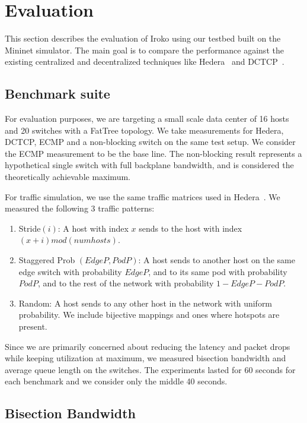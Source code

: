 
\section{Evaluation} \label{sec:evaluation}

This section describes the evaluation of Iroko using our testbed built on the
Mininet simulator. The main goal is to compare the performance against the
existing centralized and decentralized techniques like Hedera~\cite{hedera} and
DCTCP~\cite{dctcp}.

\subsection{Benchmark suite}

For evaluation purposes, we are targeting a small scale data center of 16 hosts
and 20 switches with a FatTree topology. We take measurements for Hedera, DCTCP,
ECMP and a non-blocking switch on the same test setup. We consider the ECMP measurement
to be the base line. The non-blocking result represents a hypothetical single switch with full
backplane bandwidth, and is considered the theoretically achievable maximum. 

For traffic simulation, we use the same traffic matrices used in
Hedera~\cite{hedera}. We measured the following 3
traffic patterns:

\begin{enumerate} \item Stride$\left(i\right)$: A host with index $x$ sends to
the host with index $(x + i)mod(num hosts)$.  \item Staggered Prob $\left(EdgeP,
PodP\right)$: A host sends to another host on the same edge switch with
probability $EdgeP$, and to its same pod with probability $PodP$, and to the
rest of the network with probability $1-EdgeP - PodP$.  \item Random: A host
sends to any other host in the	network with uniform probability. We include
bijective mappings and ones where hotspots are present.  \end{enumerate}

Since we are primarily concerned about reducing the latency and packet drops
while keeping utilization at maximum, we measured bisection bandwidth and
    average queue length on the switches. The experiments lasted for 60 seconds for
    each benchmark and we consider only the middle 40 seconds.

\subsection{Bisection Bandwidth}

